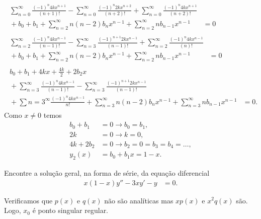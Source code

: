 \documentclass[a4paper,12pt, leqno, answers]{exam}
\begin{document}
\begin{questions}
\begin{solution}
\begin{align*}
            \begin{split}
                \sum_{n = 0}^\infty \frac{\left( -1 \right)^n 4 k x^{n + 1}}{\left( n + 1 \right)!} - \sum_{n = 0}^\infty \frac{\left( -1 \right)^n 2 k x^{n + 2}}{\left( n + 2 \right)!} + \sum_{n = 0}^\infty \frac{\left( -1 \right)^n 4 k x^{n + 1}}{\left( n + 2 \right)!} \\ {}+ b_0 + b_1 + \sum_{n = 2}^\infty n \left( n - 2 \right) b_n x^{n - 1} + \sum_{n = 2}^\infty n b_{n - 1} x^{n - 1} &= 0
            \end{split} \\
            \begin{split}
                \sum_{n = 2}^\infty \frac{\left( -1 \right)^n 4 k x^{n - 1}}{\left( n - 1 \right)!} - \sum_{n = 3}^\infty \frac{\left( -1 \right)^{n + 1} 2 k x^{n - 1}}{\left( n - 1 \right)!} + \sum_{n = 2}^\infty \frac{\left( -1 \right)^n 4 k x^{n - 1}}{\left( n \right)!} \\ {}+ b_0 + b_1 + \sum_{n = 2}^\infty n \left( n - 2 \right) b_n x^{n - 1} + \sum_{n = 2}^\infty n b_{n - 1} x^{n - 1} &= 0
            \end{split} \\
            \begin{split}
                b_0 + b_1 + 4 k x + \frac{4 k }{2} + 2 b_2 x \\ {}+ \sum_{n = 3}^\infty \frac{\left( -1 \right)^n 4 k x^{n - 1}}{\left( n - 1 \right)!} - \sum_{n = 3}^\infty \frac{\left( -1 \right)^{n + 1} 2 k x^{n -1}}{\left( n - 1 \right)!} \\ {}+ \sum{n = 3}^\infty \frac{\left( -1 \right)^n 4 k x^{n - 1}}{n!} + \sum_{n = 3}^\infty n \left( n - 2 \right) b_n x^{n - 1} + \sum_{n = 3}^\infty n b_{n - 1} x^{n - 1} &= 0.
            \end{split}
        \end{align*}
        Como $x \neq 0$ temos
        \begin{align*}
            b_0 + b_1 &= 0 \rightarrow b_0 = b_1, \\
            2 k &= 0 \rightarrow k = 0, \\
            4 k + 2 b_2 &= 0 \rightarrow b_2 = 0 = b_3 = b_4 = \ldots, \\
            y_2(x) &= b_0 + b_1 x = 1 - x.
        \end{align*}
    \end{solution}

    \question[T2 de 2011] Encontre a solu\c{c}\~{a}o geral, na forma de s\'{e}rie, da equa\c{c}\~{a}o diferencial
    \begin{align*}
        x (1 - x) y'' - 3 x y' - y &= 0.
    \end{align*}
    \begin{solution}
        Verificamos que $p(x)$ e $q(x)$ n\~{a}o s\~{a}o anal\'{i}ticas mas $x p(x)$ e $x^2 q(x)$ s\~{a}o. Logo, $x_0$ \'{e} ponto singular regular.


\end{solution}
\end{questions}
\end{document}
